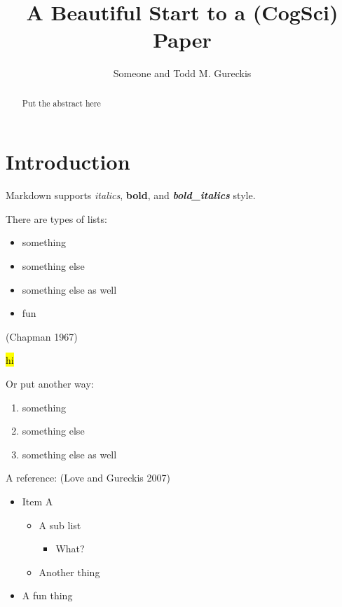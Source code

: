 \documentclass[
]{article}
\title{A Beautiful Start to a (CogSci) Paper}
\author{Someone and Todd M. Gureckis}
\date{}
\providecommand{\tightlist}{%
  \setlength{\itemsep}{0pt}\setlength{\parskip}{0pt}}
\begin{document}
\maketitle
\begin{abstract}
Put the abstract here
\end{abstract}

\hypertarget{introduction}{%
\section{Introduction}\label{introduction}}

Markdown supports \emph{italics}, \textbf{bold}, and
\textbf{\emph{bold\_italics}} style.

There are types of lists:

\begin{itemize}
\tightlist
\item
  something\\
\item
  something else\\
\item
  something else as well\\
\item
  fun
\end{itemize}

(Chapman 1967)

\hl{hi}

Or put another way:

\begin{enumerate}
\def\labelenumi{\arabic{enumi}.}
\tightlist
\item
  something\\
\item
  something else\\
\item
  something else as well
\end{enumerate}

A reference: (Love and Gureckis 2007)

\begin{itemize}
\tightlist
\item
  Item A

  \begin{itemize}
  \tightlist
  \item
    A sub list

    \begin{itemize}
    \tightlist
    \item
      What?
    \end{itemize}
  \item
    Another thing
  \end{itemize}
\item
  A fun thing
\end{itemize}
\end{document}
